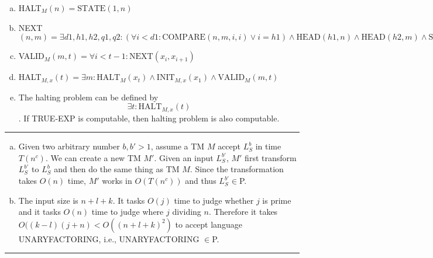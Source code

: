\documentclass[twoside]{article}
\newenvironment{problem}[2][Problem]{\begin{trivlist}
		\item[\hskip \labelsep {\bfseries #1}\hskip \labelsep {\bfseries #2.}]}{\end{trivlist}}
\newenvironment{solution}{{\bf Solution:}}{\hfill\rule{2mm}{2mm}}
\begin{document}
\begin{solution}
\begin{enumerate}[(a)]
	$
	\text{STATE}(h,n)=\exists d2,d3: \text{D2}(d2,n)\wedge\text{D3}(d3,n)\wedge(\forall d2/2+1<i<d3/2:\neg \text{BIT}(2i-1,n) \wedge \text{BIT}(2i,n))\wedge (h=d3/2-d2/2-1)
	$
	$
	\text{INIT}_{M,x}(n)=\forall i\le |x|: \neg \text{BIT}(2i-1,n) \wedge (\text{BIT}(2i,n)\wedge x[i] \vee \neg \text{BIT}(2i,n)\wedge \neg x[i] ) \wedge \text{HEAD}(0,n) \wedge \text{STATE}(0,n)
	$
	\item HALT$_M(n)=\text{STATE}(1,n)$
	\item NEXT$(n,m)=\exists d1,h1,h2,q1,q2: (\forall i<d1: \text{COMPARE}(n,m,i,i) \vee i=h1) \wedge \text{HEAD}(h1,n) \wedge\text{HEAD}(h2,m) \wedge\text{STATE}(s1,n) \wedge\text{STATE}(s2,m)\wedge <q1,BIT(2*h1,n)>\rightarrow <q2,BIT(2*h1,m),h2-h1>\in \delta$
	\item VALID$_M(m,t)=\forall i<t-1:\text{NEXT}(x_i,x_{i+1})$
	\item HALT$_{M,x}(t) = \exists m:\text{HALT}_M(x_t) \wedge \text{INIT}_{M,x}(x_1)\wedge\text{VALID}_M(m,t)$
	\item The halting problem can be defined by 
	$$
	\exists t: \text{HALT}_{M,x}(t)
	$$. If TRUE-EXP is computable, then halting problem is also computable.
\end{enumerate}

\end{solution}

\begin{problem}{1.15}
\end{problem}
\begin{solution}
\begin{enumerate}[(a)]
	\item Given two arbitrary number $b,b'>1$, assume a TM $M$ accept $L_S^b$ in time $T(n^c)$. We can create a new TM $M'$. Given an input $L_S^{b'}$, $M'$ first transform $L_S^{b'}$ to $L_S^{b}$ and then do the same thing as TM $M$.
	Since the transformation takes $O(n)$ time, $M'$ works in $O(T(n^c))$ and thus $L_S^{b'} \in $P.
	\item The input size is $n+l+k$. It tasks $O(j)$ time to judge whether $j$ is prime and it tasks $O(n)$ time to judge where $j$ dividing $n$.
	Therefore it takes $O((k-l)(j+n)<O((n+l+k)^2)$ to accept language UNARYFACTORING, i.e., UNARYFACTORING $\in$P.
\end{enumerate}
\end{solution}
\end{document}
